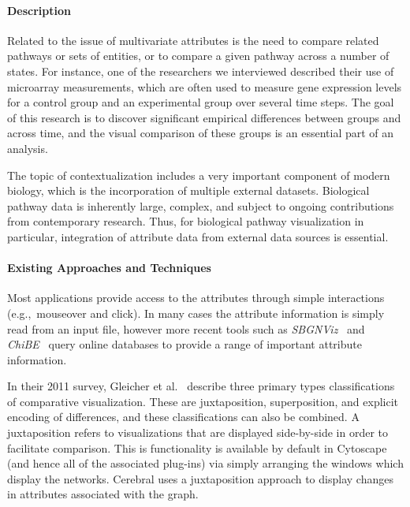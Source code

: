 \documentclass[twocolumn]{bmcart}%
\begin{document}
\paragraph*{Description}

Related to the issue of multivariate attributes is the need to compare related pathways or sets of entities, or to compare a given pathway across a number of states.
For instance, one of the researchers we interviewed described their use of microarray measurements, which are often used to measure gene expression levels for a control group and an experimental group over several time steps.
The goal of this research is to discover significant empirical differences between groups and across time, and the visual comparison of these groups is an essential part of an analysis.

The topic of contextualization includes a very important component of modern biology, which is the incorporation of multiple external datasets.
Biological pathway data is inherently large, complex, and subject to ongoing contributions from contemporary research.
Thus, for biological pathway visualization in particular, integration of attribute data from external data sources is essential.





\paragraph*{Existing Approaches and Techniques}

Most applications provide access to the attributes through simple interactions (e.g.,~mouseover and click).
In many cases the attribute information is simply read from an input file, however more recent tools such as \textit{SBGNViz}~\cite{SBGNViz2015} and \textit{ChiBE}~\cite{Babur2010chibe} query online databases to provide a range of important attribute information.

In their 2011 survey, Gleicher et al.~\cite{Gleicher2011} describe three primary types classifications of comparative visualization.
These are juxtaposition, superposition, and explicit encoding of differences, and these classifications can also be combined.
A juxtaposition refers to visualizations that are displayed side-by-side in order to facilitate comparison.
This is functionality is available by default in Cytoscape (and hence all of the associated plug-ins) via simply arranging the windows which display the networks.
Cerebral uses a juxtaposition approach to display changes in attributes associated with the graph.
\end{document}
